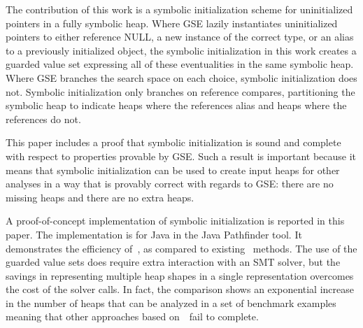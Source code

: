 The contribution of this work is a symbolic initialization scheme for uninitialized pointers in a fully symbolic heap. Where GSE lazily instantiates uninitialized pointers to either reference NULL, a new instance of the correct type, or an alias to a previously initialized object, the symbolic initialization in this work creates a guarded value set expressing all of these eventualities in the same symbolic heap. Where GSE branches the search space on each choice, symbolic initialization does not. Symbolic initialization only branches on reference compares, partitioning the symbolic heap to indicate heaps where the references alias and heaps where the references do not.

This paper includes a proof that symbolic initialization is sound and complete with respect to properties provable by GSE. Such a result is important because it means that symbolic initialization can be used to create input heaps for other analyses in a way that is provably correct with regards to GSE: there are no missing heaps and there are no extra heaps. 

A proof-of-concept implementation of symbolic initialization is reported in this paper. The implementation is for Java in the Java Pathfinder tool. It demonstrates the efficiency of~\symtxt{}, as compared to existing~\gsetxt{} methods. The use of the guarded value sets does require extra interaction with an SMT solver, but the savings in representing multiple heap shapes in a single representation overcomes the cost of the solver calls. In fact, the comparison shows an exponential increase in the number of heaps that can be analyzed in a set of benchmark examples meaning that other approaches based on~\gsetxt\ fail to complete.

